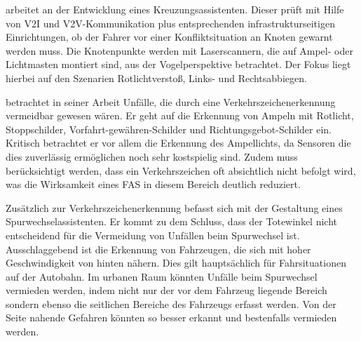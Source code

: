 \Textcite[S. 2]{Schendzielorz.21.09.2016} arbeitet an der Entwicklung eines Kreuzungsassistenten. Dieser prüft mit Hilfe von \ac{V2I} und \ac{V2V}-Kommunikation plus entsprechenden infrastrukturseitigen Einrichtungen, ob der Fahrer vor einer Konfliktsituation an Knoten gewarnt werden muss. Die Knotenpunkte werden mit Laserscannern, die auf Ampel- oder Lichtmasten montiert sind, aus der Vogelperspektive betrachtet. Der Fokus liegt hierbei auf den Szenarien Rotlichtverstoß, Links- und Rechtsabbiegen.

\Textcite[S. 224-230]{Grundl.2005} betrachtet in seiner Arbeit Unfälle, die durch eine Verkehrszeichenerkennung vermeidbar gewesen wären. Er geht auf die Erkennung von Ampeln mit Rotlicht, Stoppschilder, Vorfahrt-gewähren-Schilder und Richtungsgebot-Schilder ein. Kritisch betrachtet er vor allem die Erkennung des Ampellichts, da Sensoren die dies zuverlässig ermöglichen noch sehr kostspielig sind. Zudem muss berücksichtigt werden, dass ein Verkehrszeichen oft absichtlich nicht befolgt wird, was die Wirksamkeit eines \ac{FAS} in diesem Bereich deutlich reduziert.

Zusätzlich zur Verkehrszeichenerkennung befasst sich \Textcite[S. 239-246]{Grundl.2005} mit der Gestaltung eines Spurwechselassistenten. Er kommt zu dem Schluss, dass der Totewinkel nicht entscheidend für die Vermeidung von Unfällen beim Spurwechsel ist. Ausschlaggebend ist die Erkennung von Fahrzeugen, die sich mit hoher Geschwindigkeit von hinten nähern. Dies gilt hauptsächlich für Fahrsituationen auf der Autobahn. Im urbanen Raum könnten Unfälle beim Spurwechsel vermieden werden, indem nicht nur der vor dem Fahrzeug liegende Bereich sondern ebenso die seitlichen Bereiche des Fahrzeugs erfasst werden. Von der Seite nahende Gefahren könnten so besser erkannt und bestenfalls vermieden werden.

